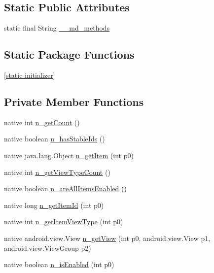 \subsection*{Static Public Attributes}
\begin{CompactItemize}
\item 
static final String \hyperlink{classmd5b60ffeb829f638581ab2bb9b1a7f4f3f_1_1_list_view_adapter_3484b09d18c193e3a6efbf9abd22592a}{\_\-\_\-md\_\-methods}
\end{CompactItemize}
\subsection*{Static Package Functions}
\begin{CompactItemize}
\item 
\hyperlink{classmd5b60ffeb829f638581ab2bb9b1a7f4f3f_1_1_list_view_adapter_95ad609e7ba116f4309bf26405bbcd43}{\mbox{[}static initializer\mbox{]}}
\end{CompactItemize}
\subsection*{Private Member Functions}
\begin{CompactItemize}
\item 
native int \hyperlink{classmd5b60ffeb829f638581ab2bb9b1a7f4f3f_1_1_list_view_adapter_485a5a7706d2d0127222a640ad6c6ed1}{n\_\-getCount} ()
\item 
native boolean \hyperlink{classmd5b60ffeb829f638581ab2bb9b1a7f4f3f_1_1_list_view_adapter_d237e904771e3cddb8fc13d616f17756}{n\_\-hasStableIds} ()
\item 
native java.lang.Object \hyperlink{classmd5b60ffeb829f638581ab2bb9b1a7f4f3f_1_1_list_view_adapter_057253a34e85b6bcb44d1b3e48810c4e}{n\_\-getItem} (int p0)
\item 
native int \hyperlink{classmd5b60ffeb829f638581ab2bb9b1a7f4f3f_1_1_list_view_adapter_3cad92205015e24d5de684144a06cb39}{n\_\-getViewTypeCount} ()
\item 
native boolean \hyperlink{classmd5b60ffeb829f638581ab2bb9b1a7f4f3f_1_1_list_view_adapter_3180d43510a1fead4449083cc3705c54}{n\_\-areAllItemsEnabled} ()
\item 
native long \hyperlink{classmd5b60ffeb829f638581ab2bb9b1a7f4f3f_1_1_list_view_adapter_4d94a96e556f7fbc2b944ec3d5543f4b}{n\_\-getItemId} (int p0)
\item 
native int \hyperlink{classmd5b60ffeb829f638581ab2bb9b1a7f4f3f_1_1_list_view_adapter_91846c130262b2cdd6b72561c12d2fde}{n\_\-getItemViewType} (int p0)
\item 
native android.view.View \hyperlink{classmd5b60ffeb829f638581ab2bb9b1a7f4f3f_1_1_list_view_adapter_d3eaeb9cf406b61873fb7130c1899fcb}{n\_\-getView} (int p0, android.view.View p1, android.view.ViewGroup p2)
\item 
native boolean \hyperlink{classmd5b60ffeb829f638581ab2bb9b1a7f4f3f_1_1_list_view_adapter_71950e3deea7602c9d56a79ca4e18abd}{n\_\-isEnabled} (int p0)
\end{CompactItemize}
